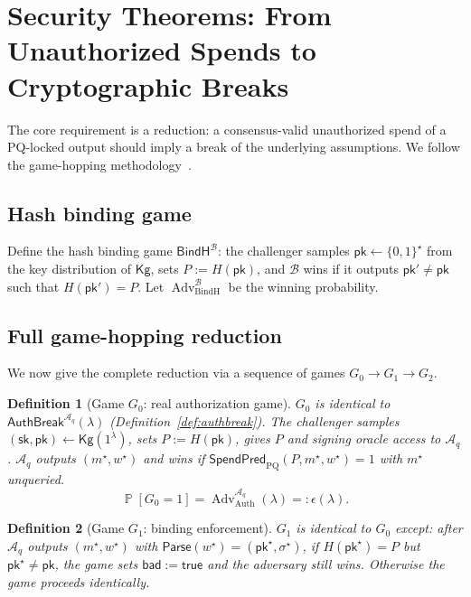 \documentclass[11pt]{article}
\newtheorem{definition}{Definition}
\newcommand{\bits}{\{0,1\}}
\newcommand{\Prob}{\operatorname{\mathbb{P}}}
\newcommand{\Adv}{\operatorname{Adv}}
\newcommand{\Aq}{\mathcal{A}_q}
\newcommand{\SpendPred}{\mathsf{SpendPred}}
\newcommand{\SpendPredPQ}{\SpendPred_{\mathrm{PQ}}}
\begin{document}
\section{Security Theorems: From Unauthorized Spends to Cryptographic Breaks}\label{sec:theorems}

The core requirement is a reduction: a consensus-valid unauthorized spend of a PQ-locked output should imply a break of the underlying assumptions.
We follow the game-hopping methodology~\cite{shoup2004sequences,bellare2006security}.

\subsection{Hash binding game}
Define the hash binding game $\mathsf{BindH}^{\mathcal{B}}$:
the challenger samples $\mathsf{pk}\leftarrow\bits^\star$ from the key distribution of $\mathsf{Kg}$, sets $P:=H(\mathsf{pk})$, and $\mathcal{B}$ wins if it outputs $\mathsf{pk}'\neq \mathsf{pk}$ such that $H(\mathsf{pk}')=P$.
Let $\Adv_{\mathrm{BindH}}^{\mathcal{B}}$ be the winning probability.

\subsection{Full game-hopping reduction}

We now give the complete reduction via a sequence of games $G_0 \to G_1 \to G_2$.

\begin{definition}[Game $G_0$: real authorization game]
$G_0$ is identical to $\mathsf{AuthBreak}^{\Aq}(\lambda)$ (Definition~\ref{def:authbreak}).
The challenger samples $(\mathsf{sk},\mathsf{pk})\gets\mathsf{Kg}(1^\lambda)$, sets $P:=H(\mathsf{pk})$, gives $P$ and signing oracle access to $\Aq$.
$\Aq$ outputs $(m^\star,w^\star)$ and wins if $\SpendPredPQ(P,m^\star,w^\star)=1$ with $m^\star$ unqueried.
\[
\Prob[G_0=1] = \Adv_{\mathrm{Auth}}^{\Aq}(\lambda) =: \epsilon(\lambda).
\]
\end{definition}

\begin{definition}[Game $G_1$: binding enforcement]
$G_1$ is identical to $G_0$ except: after $\Aq$ outputs $(m^\star,w^\star)$ with $\textsf{Parse}(w^\star)=(\mathsf{pk}^\star,\sigma^\star)$, if $H(\mathsf{pk}^\star)=P$ but $\mathsf{pk}^\star\neq\mathsf{pk}$, the game sets $\mathsf{bad}:=\mathsf{true}$ and the adversary \emph{still wins}.
Otherwise the game proceeds identically.
\end{definition}
\end{document}
